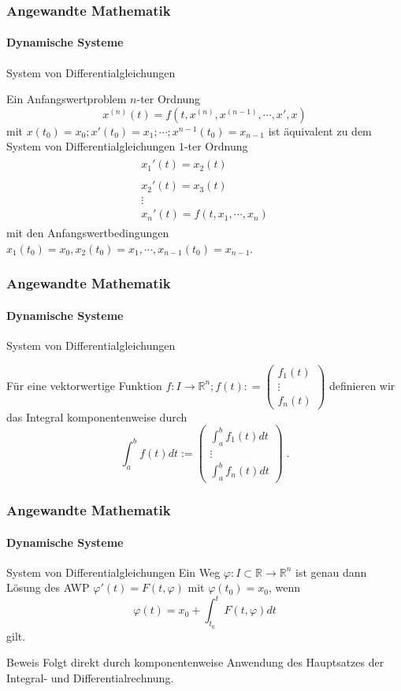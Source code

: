 \documentclass{beamer}
\begin{document}
\begin{frame}
    \frametitle{Angewandte Mathematik}
\framesubtitle{Dynamische Systeme }
\begin{block}{System von Differentialgleichungen}

Ein Anfangswertproblem $n$-ter Ordnung
 $$ x^{(n)}(t) = f(t, x^{(n)}, x^{(n-1)} , \cdots , x', x) $$ mit  $x(t_0) = x_0 ; x'(t_0) = x_1; \cdots ; x^{n-1}(t_{0})= x_{n-1}  $ ist äquivalent zu dem System von   Differentialgleichungen $1$-ter Ordnung
\begin{align*}
\begin{matrix} x_1'(t) = x_2(t) \\  \\ x_2'(t) = x_3(t) \\  \vdots  \\ x_n'(t) = f(t, x_1, \cdots, x_n )\end{matrix}
\end{align*}
mit den Anfangswertbedingungen  $x_1(t_0) = x_0 , x_2(t_0) = x_1, \cdots , x_{n-1}(t_{0})= x_{n-1} $.
\end{block}


 \end{frame}



\begin{frame}
    \frametitle{Angewandte Mathematik}
\framesubtitle{Dynamische Systeme }
\begin{block}{System von Differentialgleichungen}

Für eine  vektorwertige Funktion  $f : I   \to \mathbb{R}^n; f(t) : = \begin{pmatrix} f_1(t)  \\ \vdots \\ f_n(t) \end{pmatrix}$ definieren wir das Integral komponentenweise durch
$$\int_{a}^{b}  f(t) dt := \begin{pmatrix} \int_{a}^{b}  f_1(t) dt  \\ \vdots \\ \int_{a}^{b}  f_n(t) dt \end{pmatrix} \; .$$
\end{block}
 \end{frame}

\begin{frame}
    \frametitle{Angewandte Mathematik}
\framesubtitle{Dynamische Systeme }
\begin{block}{System von Differentialgleichungen}
Ein Weg $\varphi : I \subset \mathbb{R} \to \mathbb{R}^n$ ist genau dann Lösung des AWP $\varphi'(t) = F(t , \varphi)$ mit $ \varphi(t_0)= x_0$, wenn
$$ \varphi(t) =  x_0 + \int_{t_0}^{t} F(t, \varphi) dt$$
gilt.
\end{block}
\begin{block}{Beweis}
Folgt direkt durch komponentenweise Anwendung des Hauptsatzes der Integral- und Differentialrechnung.
\end{block}
 \end{frame}
\end{document}
